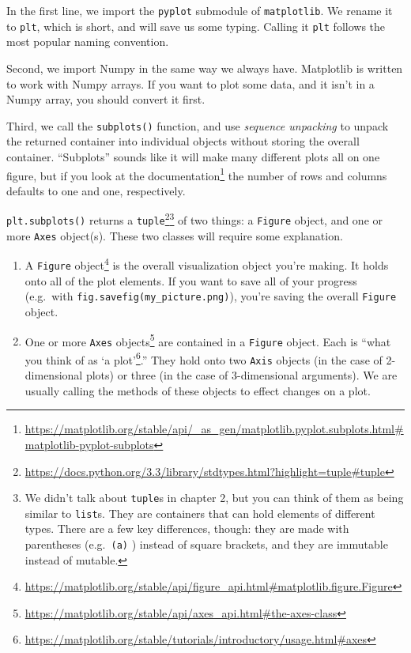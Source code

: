 \documentclass[
  12pt,
  krantz2]{krantz}
\renewcommand{\href}[2]{#2\footnote{\url{#1}}}
\begin{document}
In the first line, we import the \texttt{pyplot} submodule of \texttt{matplotlib}. We rename it to \texttt{plt}, which is short, and will save us some typing. Calling it \texttt{plt} follows the most popular naming convention.

Second, we import Numpy in the same way we always have. Matplotlib is written to work with Numpy arrays. If you want to plot some data, and it isn't in a Numpy array, you should convert it first.

Third, we call the \texttt{subplots()} function, and use \emph{sequence unpacking} to unpack the returned container into individual objects without storing the overall container. ``Subplots'' sounds like it will make many different plots all on one figure, but if you look at the \href{https://matplotlib.org/stable/api/_as_gen/matplotlib.pyplot.subplots.html\#matplotlib-pyplot-subplots}{documentation} the number of rows and columns defaults to one and one, respectively.

\texttt{plt.subplots()} returns a \href{https://docs.python.org/3.3/library/stdtypes.html?highlight=tuple\#tuple}{\texttt{tuple}}\footnote{We didn't talk about \texttt{tuple}s in chapter 2, but you can think of them as being similar to \texttt{list}s. They are containers that can hold elements of different types. There are a few key differences, though: they are made with parentheses (e.g.~\texttt{(\textquotesingle{}a\textquotesingle{})} ) instead of square brackets, and they are immutable instead of mutable.} of two things: a \texttt{Figure} object, and one or more \texttt{Axes} object(s). These two classes will require some explanation.

\begin{enumerate}
\def\labelenumi{\arabic{enumi}.}
\item
  A \href{https://matplotlib.org/stable/api/figure_api.html\#matplotlib.figure.Figure}{\texttt{Figure} object} is the overall visualization object you're making. It holds onto all of the plot elements. If you want to save all of your progress (e.g.~with \texttt{fig.savefig(\textquotesingle{}my\_picture.png\textquotesingle{})}), you're saving the overall \texttt{Figure} object.
\item
  One or more \href{https://matplotlib.org/stable/api/axes_api.html\#the-axes-class}{\texttt{Axes} objects} are contained in a \texttt{Figure} object. Each is ``\href{https://matplotlib.org/stable/tutorials/introductory/usage.html\#axes}{what you think of as `a plot'}.'' They hold onto two \texttt{Axis} objects (in the case of 2-dimensional plots) or three (in the case of 3-dimensional arguments). We are usually calling the methods of these objects to effect changes on a plot.
\end{enumerate}
\end{document}
